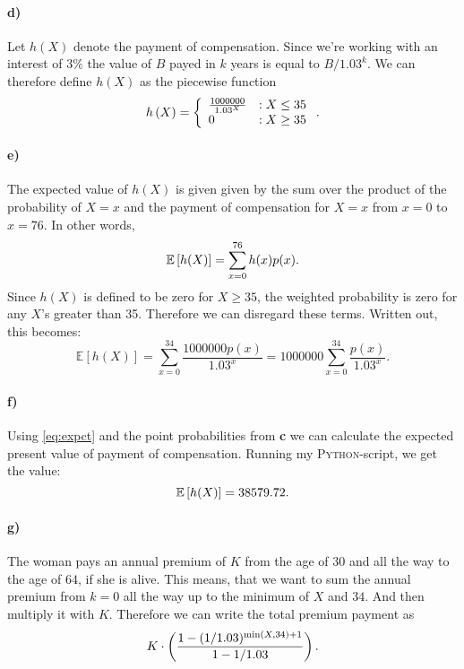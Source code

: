 \documentclass[a4paper]{article}
\theoremstyle{definition}
\begin{document}
\paragraph{d)}
Let $h\left( X \right)$ denote the payment of compensation. Since we're working
with an interest of $3\%$ the value of $B$ payed in $k$ years is equal to
$B/1.03^k$.  We can therefore define $h(X)$ as the piecewise function
\begin{equation}
  \notag
  h\left( X \right) = \left\{\begin{array}{lr}
    \frac{1000000}{1.03^X} & : X \leq 35 \\
    0 & : X \geq 35
    \end{array}
  \right..
\end{equation}

\paragraph{e)}

The expected value of $h(X)$ is given given by the sum over the product of the
probability of $X = x$ and the payment of compensation for $X = x$ from $x=0$
to $x = 76$. In other words, 
\begin{equation}
  \notag
  \mathbb{E}\left[ h(X) \right] = \sum_{x=0}^{76}h(x)p(x).
\end{equation}
Since $h(X)$ is defined to be zero for $X \geq 35$, the weighted probability is
zero for any $X$'s greater than 35. Therefore we can disregard these
terms.  Written out, this becomes:
\begin{equation}
  \label{eq:expct}
  \mathbb{E}\left[ h(X) \right] = \sum_{x=0}^{34} \frac{1000000p(x)}{1.03^x} = 1000000\sum_{x=0}^{34}\frac{p(x)}{1.03^x}.
\end{equation}

\paragraph{f)}
Using \eqref{eq:expct} and the point probabilities from \textbf{c} we can calculate
the expected present value of payment of compensation.
Running my \textsc{Python}-script, we get the value:
\begin{equation}
  \notag
  \mathbb{E}\left[ h(X) \right] = 38579.72.
\end{equation}

\paragraph{g)}
The woman pays an annual premium of $K$ from the age of $30$ and all the way to
the age of $64$, if she is alive. This means, that we want to sum the annual
premium from $k = 0$ all the way up to the minimum of $X$ and $34$. And then
multiply it with $K$.  Therefore we can write the total premium payment as
\begin{equation}
  \notag
  K \cdot \left( \frac{1 - (1/1.03)^{\min\left( X, 34 \right)+1}}{1 - 1/1.03} \right).
\end{equation}
\end{document}
